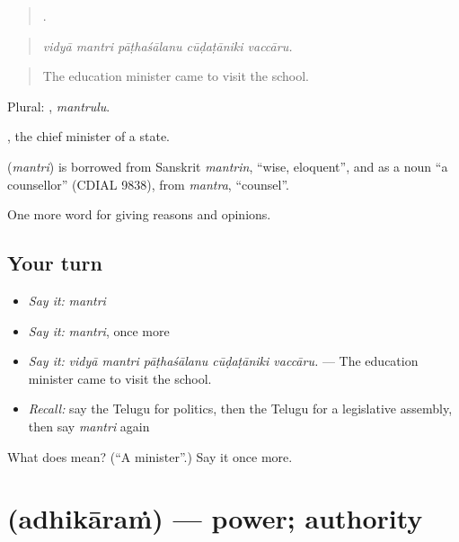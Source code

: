 \begin{quote}
    .
\end{quote}

\begin{quote}
\emph{vidyā mantri pāṭhaśālanu cūḍaṭāniki vaccāru.}
\end{quote}

\begin{quote}
The education minister came to visit the school.
\end{quote}

Plural: , \emph{mantrulu}.

, the chief minister of a state.

\begin{cousinweb}
\textbf{} (\emph{mantri}) is borrowed from Sanskrit \emph{mantrin}, \textquotedblleft{}wise, eloquent\textquotedblright{}, and as a noun \textquotedblleft{}a counsellor\textquotedblright{} (CDIAL 9838), from \emph{mantra}, \textquotedblleft{}counsel\textquotedblright{}.
\end{cousinweb}

\begin{grammarlens}[title={What you've built}]
One more word for giving reasons and opinions.
\end{grammarlens}

\subsection*{Your turn}
\begin{itemize}
\raggedright
  \item \emph{Say it:} \emph{mantri}
  \item \emph{Say it:} \emph{mantri}, once more
  \item \emph{Say it:} \emph{vidyā mantri pāṭhaśālanu cūḍaṭāniki vaccāru.} — The education minister came to visit the school.
  \item \emph{Recall:} say the Telugu for politics, then the Telugu for a legislative assembly, then say \emph{mantri} again
\end{itemize}

\begin{tcolorbox}[breakable,colback=teal!4,colframe=teal!35!black,title={Before you move on}]
What does  mean? (\textquotedblleft{}A minister\textquotedblright{}.) Say it once more.
\end{tcolorbox}
\section[\texorpdfstring{\te{అధికారం} (adhikāraṁ)}{అధికారం (adhikāraṁ)}]{ (adhikāraṁ) — power; authority}

